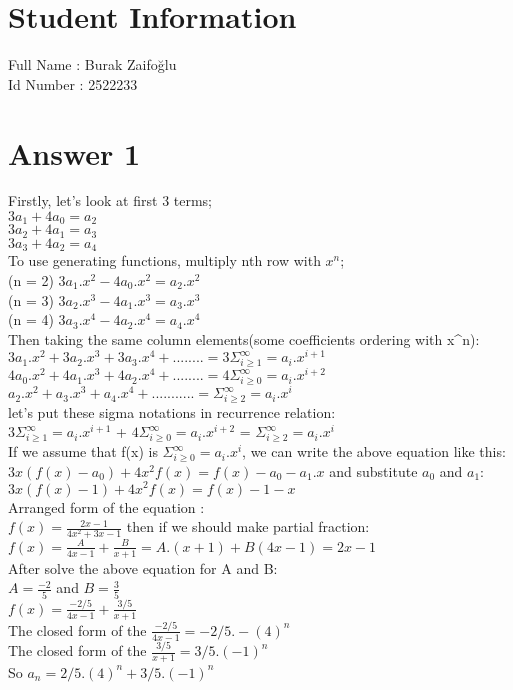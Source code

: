 \documentclass[12pt]{article}
\begin{document}
\section*{Student Information } 
Full Name :  Burak Zaifoğlu\\
Id Number :  2522233\\

\section*{Answer 1}
Firstly, let's look at first 3 terms;\\
$3a_1 + 4a_0 = a_2$\\
$3a_2 + 4a_1 = a_3$\\
$3a_3 + 4a_2 = a_4$\\
To use generating functions, multiply nth row with $x^n$;\\
(n = 2) $3a_1.x^2 - 4a_0.x^2 = a_2.x^2$\\
(n = 3) $3a_2.x^3 - 4a_1.x^3 = a_3.x^3$\\
(n = 4) $3a_3.x^4 - 4a_2.x^4 = a_4.x^4$\\
Then taking the same column elements(some coefficients ordering with x^n):\\
$3a_1.x^2+3a_2.x^3+3a_3.x^4+........ = 3$$ \Sigma_{i\ge1}^\infty = a_i.x^{i+1}$\\
$4a_0.x^2+4a_1.x^3+4a_2.x^4+........ = 4$$ \Sigma_{i\ge0}^\infty = a_i.x^{i+2}$\\
$a_2.x^2+a_3.x^3+a_4.x^4+........... = $$ \Sigma_{i\ge2}^\infty = a_i.x^i$\\
let's put these sigma notations in recurrence relation:\\
$ 3\Sigma_{i\ge1}^\infty = a_i.x^{i+1}$ + $ 4\Sigma_{i\ge0}^\infty = a_i.x^{i+2}$ = $ \Sigma_{i\ge2}^\infty = a_i.x^i$\\
If we assume that f(x) is $ \Sigma_{i\ge0}^\infty = a_i.x^i$, we can write the above equation like this:\\
$3x(f(x)-a_0)+4x^2f(x) = f(x) - a_0 - a_1.x$ and substitute $a_0$ and $a_1$:\\
$3x(f(x)-1)+4x^2f(x) = f(x) - 1 -x$\\
Arranged form of the equation : \\
$f(x) = \frac{2x-1}{4x^2+3x-1}$ then if we should make partial fraction:\\
$f(x) = \frac{A}{4x-1}+\frac{B}{x+1} = A.(x+1)+B(4x-1) = 2x-1$\\
After solve the above equation for A and B:\\
$A = \frac{-2}{5}$ and $B = \frac{3}{5}$\\
$f(x) = \frac{-2/5}{4x-1}+\frac{3/5}{x+1}$\\
The closed form of the $\frac{-2/5}{4x-1} = -2/5.-(4)^n$\\
The closed form of the $\frac{3/5}{x+1} = 3/5.(-1)^n$\\
So $a_n = 2/5.(4)^n + 3/5.(-1)^n$
\end{document}
